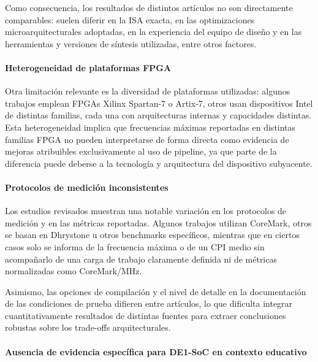 Como consecuencia, los resultados de distintos artículos no son directamente
comparables: suelen diferir en la ISA exacta, en las optimizaciones
microarquitecturales adoptadas, en la experiencia del equipo de diseño y en
las herramientas y versiones de síntesis utilizadas, entre otros
factores.


\paragraph{Heterogeneidad de plataformas FPGA}

Otra limitación relevante es la diversidad de plataformas utilizadas: algunos
trabajos emplean FPGAs Xilinx Spartan-7 o Artix-7, otros usan dispositivos
Intel de distintas familias, cada una con arquitecturas internas y capacidades
distintas.\parencite{Heinz2019Catalog,Wei2024NEORV32}
Esta heterogeneidad implica que frecuencias máximas reportadas en distintas
familias FPGA no pueden interpretarse de forma directa como evidencia de mejoras
atribuibles exclusivamente al uso de pipeline, ya que parte de la diferencia
puede deberse a la tecnología y arquitectura del dispositivo
subyacente.\parencite{Chu2011FPGA}


\paragraph{Protocolos de medición inconsistentes}

Los estudios revisados muestran una notable variación en los protocolos de
medición y en las métricas reportadas.\parencite{Heinz2019Catalog,Wei2024NEORV32}
Algunos trabajos utilizan CoreMark, otros se basan en Dhrystone u otros
benchmarks específicos, mientras que en ciertos casos solo se informa de la
frecuencia máxima o de un CPI medio sin acompañarlo de una carga de trabajo
claramente definida ni de métricas normalizadas como
CoreMark/MHz.\parencite{eembc_nd_coremark,arm2022coremark}

Asimismo, las opciones de compilación y el nivel de detalle en la
documentación de las condiciones de prueba difieren entre artículos, lo que
dificulta integrar cuantitativamente resultados de distintas fuentes para
extraer conclusiones robustas sobre los trade-offs
arquitecturales.\parencite{Heinz2019Catalog}


\paragraph{Ausencia de evidencia específica para DE1-SoC en contexto educativo}

